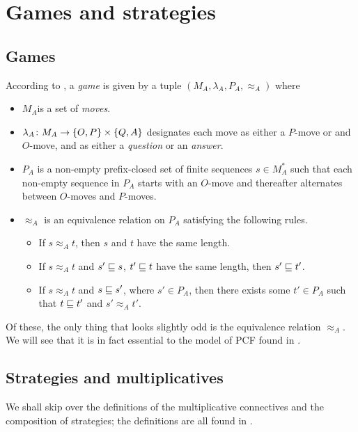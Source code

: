 \documentclass{article}
\begin{document}
\section{Games and strategies}

\subsection{Games}

According to \cite{ajmPcf}, a \emph{game} is given by a tuple $(M_A,\lambda_A,P_A,\approx_A)$ where

\begin{itemize}
  \item $M_A$is a set of \emph{moves}.
  \item $\lambda_A\colon M_A\to \{O,P\} \times \{Q,A\}$ designates each move as either a $P$-move or and $O$-move, and as either a \emph{question} or an \emph{answer}.
  \item $P_A$ is a non-empty prefix-closed set of finite sequences $s\in M_A^*$ such that each non-empty sequence in $P_A$ starts with an $O$-move and thereafter alternates between $O$-moves and $P$-moves.
  \item $\approx_A$ is an equivalence relation on $P_A$ satisfying the following rules.
    \begin{itemize}
      \item If $s\approx_A t$, then $s$ and $t$ have the same length.
      \item If $s\approx_A t$ and $s'\sqsubseteq s$, $t'\sqsubseteq t$ have the same length, then $s'\sqsubseteq t'$.
      \item If $s\approx_A t$ and $s\sqsubseteq s'$, where $s'\in P_A$, then there exists some $t'\in P_A$ such that $t\sqsubseteq t'$ and $s'\approx_A t'$.
    \end{itemize}
\end{itemize}

Of these, the only thing that looks slightly odd is the equivalence relation $\approx_A$.  
We will see that it is in fact essential to the model of PCF found in \cite{ajmPcf}.

\subsection{Strategies and multiplicatives}

We shall skip over the definitions of the multiplicative connectives and the composition of strategies; the definitions are all found in \cite{ajmPcf}.
\end{document}
